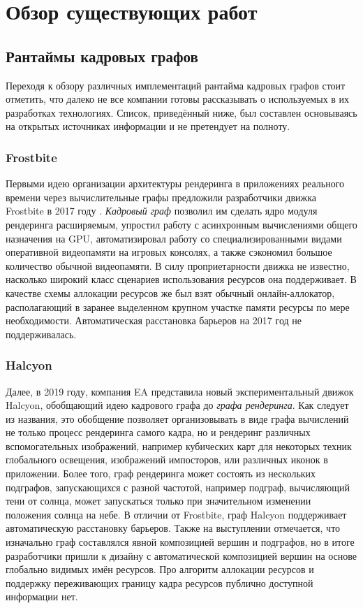 \section{Обзор существующих работ}
\subsection{Рантаймы кадровых графов}
Переходя к обзору различных имплементаций рантайма кадровых графов стоит отметить, что далеко не все компании готовы рассказывать о используемых в их разработках технологиях. Список, приведённый ниже, был составлен основываясь на открытых источниках информации и не претендует на полноту.
\subsubsection*{Frostbite}
Первыми идею организации архитектуры рендеринга в приложениях реального времени через вычислительные графы предложили разработчики движка Frostbite в 2017 году \cite{FrostbiteGdcTalk}.
\textit{Кадровый граф} позволил им сделать ядро модуля рендеринга расширяемым, упростил работу с асинхронным вычислениями общего назначения на GPU, автоматизировал работу со специализированными видами оперативной видеопамяти на игровых консолях, а также сэкономил большое количество обычной видеопамяти.
В силу проприетарности движка не известно, насколько широкий класс сценариев использования ресурсов она поддерживает.
В качестве схемы аллокации ресурсов же был взят обычный онлайн-аллокатор, располагающий в заранее выделенном крупном участке памяти ресурсы по мере необходимости.
Автоматическая расстановка барьеров на 2017 год не поддерживалась.

\subsubsection*{Halcyon}
Далее, в 2019 году, компания EA представила \cite{HalcyonRapidInnovationTalk} новый экспериментальный движок Halcyon, обобщающий идею кадрового графа до \textit{графа рендеринга}.
Как следует из названия, это обобщение позволяет организовывать в виде графа вычислений не только процесс рендеринга самого кадра, но и рендеринг различных вспомогательных изображений, например кубических карт для некоторых техник глобального освещения, изображений импосторов, или различных иконок в приложении.
Более того, граф рендеринга может состоять из нескольких подграфов, запускающихся с разной частотой, например подграф, вычисляющий тени от солнца, может запускаться только при значительном изменении положения солнца на небе.
В отличии от Frostbite, граф Halcyon поддерживает автоматическую расстановку барьеров.
Также на выступлении отмечается, что изначально граф составлялся явной композицией вершин и подграфов, но в итоге разработчики пришли к дизайну с автоматической композицией вершин на основе глобально видимых имён ресурсов.
Про алгоритм аллокации ресурсов и поддержку переживающих границу кадра ресурсов публично доступной информации нет.

